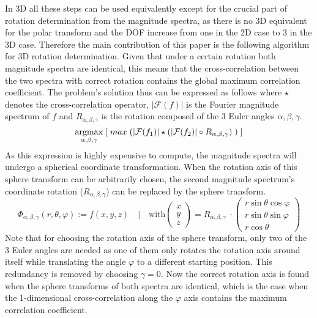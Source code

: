 In 3D all these steps can be used equivalently except for the crucial part of rotation determination from the magnitude spectra, as there is no 3D equivalent for the polar transform and the DOF increase from one in the 2D case to 3 in the 3D case.
Therefore the main contribution of this paper is the following algorithm for 3D rotation determination.
Given that under a certain rotation both magnitude spectra are identical, this means that the cross-correlation between the two spectra with correct rotation contains the global maximum correlation coefficient.
The problem's solution thus can be expressed as follows where $\star$ denotes the cross-correlation operator, $|\mathcal{F}(f)|$ is the Fourier magnitude spectrum of $f$ and $R_{\alpha,\beta,\gamma}$ is the rotation composed of the 3 Euler angles $\alpha,\beta,\gamma$.
\begin{equation}
\operatorname*{argmax}_{\alpha,\beta,\gamma}\;[\;max\;(|\mathcal{F}(f_1)| \star (|\mathcal{F}(f_2)| \circ R_{\alpha,\beta,\gamma})\;)\;]
\end{equation}
As this expression is highly expensive to compute, the magnitude spectra will undergo a spherical coordinate transformation. 
When the rotation axis of this sphere transform can be arbitrarily chosen, the second magnitude spectrum's coordinate rotation ($R_{\alpha,\beta,\gamma}$) can be replaced by the sphere transform.
\begin{equation}\label{eq:rotatedspheretransform}
\Phi_{\alpha,\beta,\gamma}(r,\theta,\varphi) := f(x,y,z) \quad|\quad \text{with} 
\begin{pmatrix}
x \\ y \\ z
\end{pmatrix}
= R_{\alpha,\beta,\gamma} \; \cdot
\begin{pmatrix}
r \sin \theta \cos \varphi \\ 
r \sin \theta \sin \varphi \\ 
r \cos \theta
\end{pmatrix}
\end{equation}
Note that for choosing the rotation axis of the sphere transform, only two of the 3 Euler angles are needed as one of them only rotates the rotation axis around itself while translating the angle $\varphi$ to a different starting position. 
This redundancy is removed by choosing $\gamma=0$.
Now the correct rotation axis is found when the sphere transforms of both spectra are identical, which is the case when the 1-dimensional cross-correlation along the $\varphi$ axis contains the maximum correlation coefficient.
